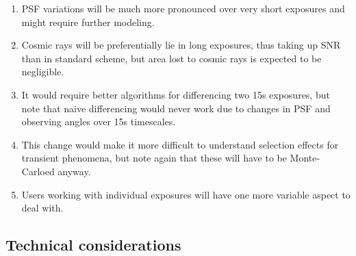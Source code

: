 \documentclass[12pt, a4paper]{article}
\begin{document}
\begin{enumerate}

\item PSF variations will be much more pronounced over very short
  exposures and might require further modeling. 

\item Cosmic rays will be preferentially lie in long exposures,
  thus taking up SNR than in standard scheme, but area lost to cosmic
  rays is expected to be negligible.

\item It would require better algorithms for differencing two 15s
  exposures, but note that naive differencing would never work due to
  changes in PSF and observing angles over 15s timescales.

\item This change would make it more difficult to understand selection
  effects for transient phenomena, but note again that these will have
  to be Monte-Carloed anyway.

\item Users working with individual exposures will have one more
  variable aspect to deal with.

\end{enumerate}

\subsection*{Technical considerations}
\end{document}

